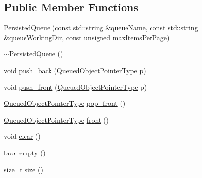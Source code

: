 \subsection*{Public Member Functions}
\begin{DoxyCompactItemize}
\item 
\hyperlink{classkisscpp_1_1_persisted_queue_a2cd18dcb5bcb354e9cc84897f71077f7}{Persisted\-Queue} (const std\-::string \&queue\-Name, const std\-::string \&queue\-Working\-Dir, const unsigned max\-Items\-Per\-Page)
\item 
\hyperlink{classkisscpp_1_1_persisted_queue_aa7b51ad9ce0381d197eea1c5aabcac12}{$\sim$\-Persisted\-Queue} ()
\item 
void \hyperlink{classkisscpp_1_1_persisted_queue_aad570ffebafdabe33d565563aa037d9c}{push\-\_\-back} (\hyperlink{persisted__queue_8hpp_afaed39dc5f50bc993872e2d46490667c}{Queued\-Object\-Pointer\-Type} p)
\item 
void \hyperlink{classkisscpp_1_1_persisted_queue_a7c621270f05ecb9bcffb3112e5f46ec4}{push\-\_\-front} (\hyperlink{persisted__queue_8hpp_afaed39dc5f50bc993872e2d46490667c}{Queued\-Object\-Pointer\-Type} p)
\item 
\hyperlink{persisted__queue_8hpp_afaed39dc5f50bc993872e2d46490667c}{Queued\-Object\-Pointer\-Type} \hyperlink{classkisscpp_1_1_persisted_queue_a59281db3a6b7e50c6291d6c707152aea}{pop\-\_\-front} ()
\item 
\hyperlink{persisted__queue_8hpp_afaed39dc5f50bc993872e2d46490667c}{Queued\-Object\-Pointer\-Type} \hyperlink{classkisscpp_1_1_persisted_queue_a845cd8c74c5c8996b57bc0663f540940}{front} ()
\item 
void \hyperlink{classkisscpp_1_1_persisted_queue_a1ad220b2617f732878013e8df8cfadce}{clear} ()
\item 
bool \hyperlink{classkisscpp_1_1_persisted_queue_a59ce4b260c250368e50ed77becb02415}{empty} ()
\item 
size\-\_\-t \hyperlink{classkisscpp_1_1_persisted_queue_ab6c18f15d6ac9ccad453729f0e7fa935}{size} ()
\end{DoxyCompactItemize}


